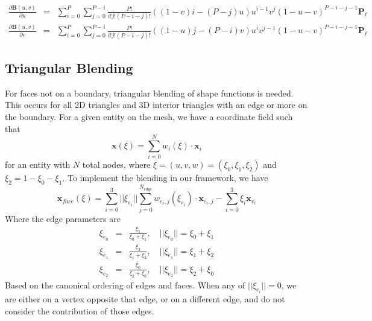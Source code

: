 \documentclass{article}
\begin{document}
\begin{eqnarray*}
\frac{\partial \mathbf{B}(u,v)}{\partial u} &=& \displaystyle\sum_{i=0}^P \sum_{j=0}^{P-i}\frac{P!}{i!j!(P-i-j)!}((1-v)i-(P-j)u)u^{i-1}v^j(1-u-v)^{P-i-j-1}\mathbf{P}_\ell \\
\frac{\partial \mathbf{B}(u,v)}{\partial v} &=& \displaystyle\sum_{i=0}^P \sum_{j=0}^{P-i}\frac{P!}{i!j!(P-i-j)!}((1-u)j-(P-i)v)u^{i}v^{j-1}(1-u-v)^{P-i-j-1}\mathbf{P}_\ell
\end{eqnarray*}
\subsection{Triangular Blending}
For faces not on a boundary, triangular blending of shape functions is needed. This occurs for all 2D triangles and 3D interior triangles with an edge or more on the boundary. For a given entity on the mesh, we have a coordinate field such that 
\[ \mathbf{x}(\xi) = \sum_{i=0}^N w_i(\xi) \cdot \mathbf{x}_i \]
for an entity with $N$ total nodes, where $\xi = (u,v,w) = (\xi_0,\xi_1,\xi_2)$ and $\xi_2 = 1-\xi_0-\xi_1$. To implement the blending in our framework, we have 
\[\mathbf{x}_{face}(\xi) = \sum_{i=0}^{3}||\xi_{e_i}||\sum_{j=0}^{N_{edge}}w_{e_i,j}(\xi_{e_i})\cdot\mathbf{x}_{e_i,j}- \sum_{i=0}^{3}\xi_i\mathbf{x}_{v_i}\]
Where the edge parameters are
\begin{eqnarray*} 
\xi_{e_0} & = & \frac{\xi_1}{\xi_0+\xi_1},\quad ||\xi_{e_0}|| = \xi_0+\xi_1 \\
\xi_{e_1} & = & \frac{\xi_2}{\xi_1+\xi_2},\quad ||\xi_{e_1}|| = \xi_1+\xi_2 \\
\xi_{e_2} & = & \frac{\xi_0}{\xi_2+\xi_0},\quad ||\xi_{e_2}|| = \xi_2+\xi_0 
\end{eqnarray*}
Based on the canonical ordering of edges and faces. When any of $||\xi_{e_i}|| = 0$, we are either on a vertex opposite that edge, or on a different edge, and do not consider the contribution of those edges.
\end{document}
